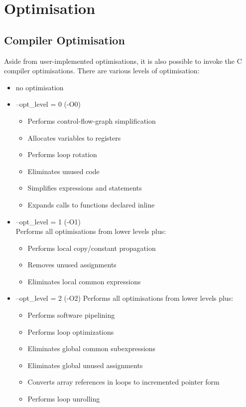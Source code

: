 \newpage
\section{Optimisation}
\subsection{Compiler Optimisation}
Aside from user-implemented optimisations, it is also possible to invoke the C compiler optimisations. There are various levels of optimisation: %
\begin{itemize}
    \item no optimisation
    
    \item --opt\_level = 0 (-O0)
    \begin{itemize}
        \item Performs control-flow-graph simplification
        \item Allocates variables to registers
        \item Performs loop rotation
        \item Eliminates unused code
        \item Simplifies expressions and statements
        \item Expands calls to functions declared inline
    \end{itemize}
    
    \item --opt\_level = 1 (-O1) \\
    Performs all optimisations from lower levels plus:
    \begin{itemize}
        \item Performs local copy/constant propagation
        \item Removes unused assignments
        \item Eliminates local common expressions
    \end{itemize}
    
    \item --opt\_level = 2 (-O2)
    Performs all optimisations from lower levels plus:
    \begin{itemize}
        \item Performs software pipelining 
        \item Performs loop optimizations
        \item Eliminates global common subexpressions
        \item Eliminates global unused assignments
        \item Converts array references in loops to incremented pointer form
        \item Performs loop unrolling
    \end{itemize}
    

\end{itemize}
